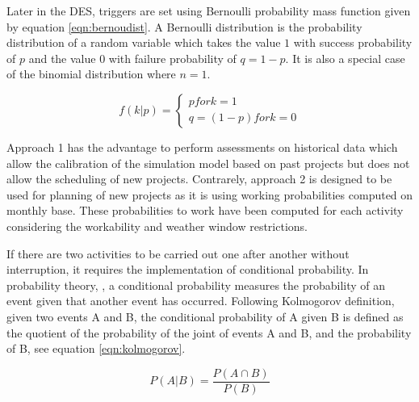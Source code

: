 Later in the DES, triggers are set using Bernoulli probability mass function given by equation \ref{eqn:bernoudist}. A Bernoulli distribution is the probability distribution of a random variable which takes the value $1$ with success probability of $p$ and the value $0$ with failure probability of $q=1-p$.  It is also a special case of the binomial distribution where $n=1$.

\begin{equation}
\label{eqn:bernoudist}
f\left(k \vert p \right) = \begin{cases} p for k=1 \\ q=(1-p) for k=0 \end{cases}
\end{equation}






Approach 1 has the advantage to perform assessments on historical data which allow the calibration of the simulation model based on past projects but does not allow the scheduling of new projects. Contrarely, approach 2 is designed to be used for planning of new projects as it is using working probabilities computed on monthly base. These probabilities to work have been computed for each activity considering the workability and weather window restrictions.



If there are two activities to be carried out one after another without interruption, it requires the implementation of conditional probability.  
In probability theory, \cite{Thalemann2012}, a conditional probability measures the probability of an event given that another event has occurred. Following Kolmogorov definition, given two events A and B, the conditional probability of A given B is defined as the quotient of the probability of the joint of events A and B, and the probability of B, see equation \ref{eqn:kolmogorov}.

\begin{equation}
\label{eqn:kolmogorov}
P \left(A \vert B \right) = \frac{P \left(A \cap B \right)}{P \left( B \right)}
\end{equation}

